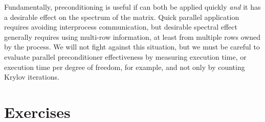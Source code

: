 Fundamentally, preconditioning is useful if can both be applied quickly \emph{and} it has a desirable effect on the spectrum of the matrix.  Quick parallel application requires avoiding interprocess communication, but desirable spectral effect generally requires using multi-row information, at least from multiple rows owned by the process.  We will not fight against this situation, but we must be careful to evaluate parallel preconditioner effectiveness by measuring execution time, or execution time per degree of freedom, for example, and not only by counting Krylov iterations.


\bigskip
\section{Exercises}

